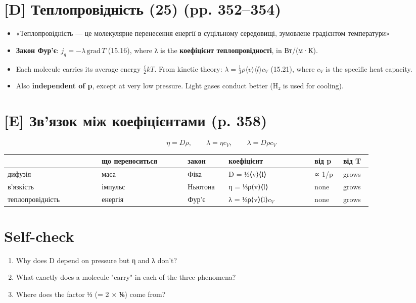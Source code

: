 \documentclass[11pt,a4paper,oneside]{book}
\begin{document}
\section*{[D] Теплопровідність (25) (pp. 352–354)}
\begin{itemize}
\item «Теплопровідність — це молекулярне перенесення енергії в суцільному середовищі, зумовлене градієнтом температури»
\item \textbf{Закон Фур'є}: $j_q = -\lambda\,\text{grad}\,T$ (15.16), where λ is the \textbf{коефіцієнт теплопровідності}, in Вт/(м·К).
\item Each molecule carries its average energy $\tfrac i2kT$. From kinetic theory:
$\lambda = \tfrac13\rho\langle v\rangle\langle l\rangle c_V$ (15.21), where $c_{V}$ is the specific heat capacity.
\item Also \textbf{independent of p}, except at very low pressure. Light gases conduct better (H₂ is used for cooling).
\end{itemize}

\section*{[E] Зв'язок між коефіцієнтами (p. 358)}
\[\eta = D\rho,\qquad \lambda = \eta c_V,\qquad \lambda = D\rho c_V\]
{\footnotesize
\begin{longtable}{>{\raggedright\arraybackslash}p{0.230\linewidth}>{\raggedright\arraybackslash}p{0.215\linewidth}>{\raggedright\arraybackslash}p{0.100\linewidth}>{\raggedright\arraybackslash}p{0.215\linewidth}>{\raggedright\arraybackslash}p{0.072\linewidth}>{\raggedright\arraybackslash}p{0.072\linewidth}}
\toprule
\textbf{} & \textbf{що переноситься} & \textbf{закон} & \textbf{коефіцієнт} & \textbf{від p} & \textbf{від T} \\
\midrule
\endhead
дифузія & маса & Фіка & D = ⅓⟨v⟩⟨l⟩ & ∝ 1/p & grows \\
в'язкість & імпульс & Ньютона & η = ⅓ρ⟨v⟩⟨l⟩ & none & grows \\
теплопровідність & енергія & Фур'є & λ = ⅓ρ⟨v⟩⟨l⟩$c_{V}$ & none & grows \\
\bottomrule
\end{longtable}
}

\section*{Self-check}
\begin{enumerate}
\item Why does D depend on pressure but η and λ don't?
\item What exactly does a molecule "carry" in each of the three phenomena?
\item Where does the factor ⅓ (= 2 × ⅙) come from?
\end{enumerate}
\end{document}
